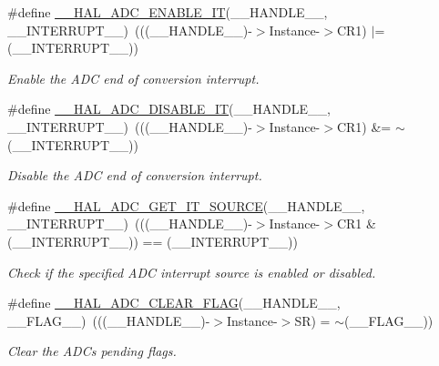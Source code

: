 \begin{DoxyCompactItemize}
\#define \mbox{\hyperlink{group___a_d_c___exported___macros_ga650073de508d335d0a1c7bf9b4d07afe}{\+\_\+\+\_\+\+H\+A\+L\+\_\+\+A\+D\+C\+\_\+\+E\+N\+A\+B\+L\+E\+\_\+\+IT}}(\+\_\+\+\_\+\+H\+A\+N\+D\+L\+E\+\_\+\+\_\+,  \+\_\+\+\_\+\+I\+N\+T\+E\+R\+R\+U\+P\+T\+\_\+\+\_\+)~(((\+\_\+\+\_\+\+H\+A\+N\+D\+L\+E\+\_\+\+\_\+)-\/$>$Instance-\/$>$C\+R1) $\vert$= (\+\_\+\+\_\+\+I\+N\+T\+E\+R\+R\+U\+P\+T\+\_\+\+\_\+))
\begin{DoxyCompactList}\small\item\em Enable the A\+DC end of conversion interrupt. \end{DoxyCompactList}\item 
\#define \mbox{\hyperlink{group___a_d_c___exported___macros_gadcec48b44a2133effd20f41ab227edb9}{\+\_\+\+\_\+\+H\+A\+L\+\_\+\+A\+D\+C\+\_\+\+D\+I\+S\+A\+B\+L\+E\+\_\+\+IT}}(\+\_\+\+\_\+\+H\+A\+N\+D\+L\+E\+\_\+\+\_\+,  \+\_\+\+\_\+\+I\+N\+T\+E\+R\+R\+U\+P\+T\+\_\+\+\_\+)~(((\+\_\+\+\_\+\+H\+A\+N\+D\+L\+E\+\_\+\+\_\+)-\/$>$Instance-\/$>$C\+R1) \&= $\sim$(\+\_\+\+\_\+\+I\+N\+T\+E\+R\+R\+U\+P\+T\+\_\+\+\_\+))
\begin{DoxyCompactList}\small\item\em Disable the A\+DC end of conversion interrupt. \end{DoxyCompactList}\item 
\#define \mbox{\hyperlink{group___a_d_c___exported___macros_gaf29cd943cb451e4ed1f07bd7d4854fb0}{\+\_\+\+\_\+\+H\+A\+L\+\_\+\+A\+D\+C\+\_\+\+G\+E\+T\+\_\+\+I\+T\+\_\+\+S\+O\+U\+R\+CE}}(\+\_\+\+\_\+\+H\+A\+N\+D\+L\+E\+\_\+\+\_\+,  \+\_\+\+\_\+\+I\+N\+T\+E\+R\+R\+U\+P\+T\+\_\+\+\_\+)~(((\+\_\+\+\_\+\+H\+A\+N\+D\+L\+E\+\_\+\+\_\+)-\/$>$Instance-\/$>$C\+R1 \& (\+\_\+\+\_\+\+I\+N\+T\+E\+R\+R\+U\+P\+T\+\_\+\+\_\+)) == (\+\_\+\+\_\+\+I\+N\+T\+E\+R\+R\+U\+P\+T\+\_\+\+\_\+))
\begin{DoxyCompactList}\small\item\em Check if the specified A\+DC interrupt source is enabled or disabled. \end{DoxyCompactList}\item 
\#define \mbox{\hyperlink{group___a_d_c___exported___macros_gafe44e1e66141bca3665bb82981a81a17}{\+\_\+\+\_\+\+H\+A\+L\+\_\+\+A\+D\+C\+\_\+\+C\+L\+E\+A\+R\+\_\+\+F\+L\+AG}}(\+\_\+\+\_\+\+H\+A\+N\+D\+L\+E\+\_\+\+\_\+,  \+\_\+\+\_\+\+F\+L\+A\+G\+\_\+\+\_\+)~(((\+\_\+\+\_\+\+H\+A\+N\+D\+L\+E\+\_\+\+\_\+)-\/$>$Instance-\/$>$SR) = $\sim$(\+\_\+\+\_\+\+F\+L\+A\+G\+\_\+\+\_\+))
\begin{DoxyCompactList}\small\item\em Clear the A\+DC\textquotesingle{}s pending flags. \end{DoxyCompactList}\item 

\end{DoxyCompactItemize}
